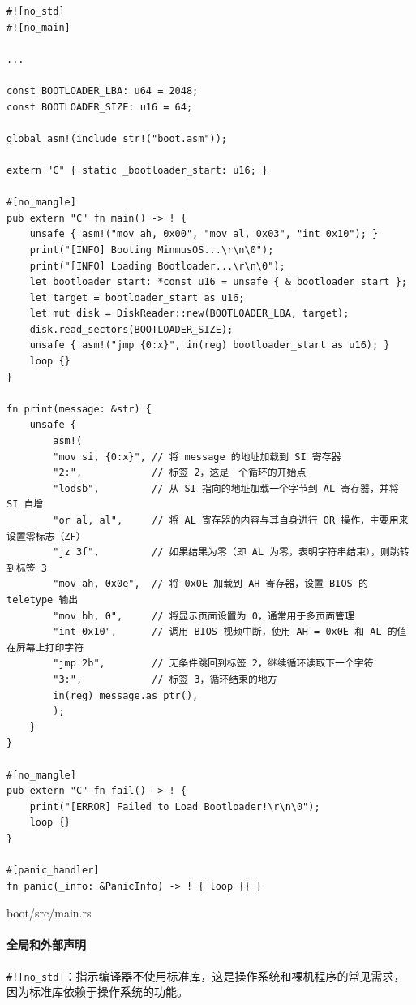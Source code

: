 \begin{listing}[htbp]
    \begin{verbatim}
#![no_std]
#![no_main]

...

const BOOTLOADER_LBA: u64 = 2048;
const BOOTLOADER_SIZE: u16 = 64;

global_asm!(include_str!("boot.asm"));

extern "C" { static _bootloader_start: u16; }

#[no_mangle]
pub extern "C" fn main() -> ! {
    unsafe { asm!("mov ah, 0x00", "mov al, 0x03", "int 0x10"); }
    print("[INFO] Booting MinmusOS...\r\n\0");
    print("[INFO] Loading Bootloader...\r\n\0");
    let bootloader_start: *const u16 = unsafe { &_bootloader_start };
    let target = bootloader_start as u16;
    let mut disk = DiskReader::new(BOOTLOADER_LBA, target);
    disk.read_sectors(BOOTLOADER_SIZE);
    unsafe { asm!("jmp {0:x}", in(reg) bootloader_start as u16); }
    loop {}
}

fn print(message: &str) {
    unsafe {
        asm!(
        "mov si, {0:x}", // 将 message 的地址加载到 SI 寄存器
        "2:",            // 标签 2，这是一个循环的开始点
        "lodsb",         // 从 SI 指向的地址加载一个字节到 AL 寄存器，并将 SI 自增
        "or al, al",     // 将 AL 寄存器的内容与其自身进行 OR 操作，主要用来设置零标志（ZF）
        "jz 3f",         // 如果结果为零（即 AL 为零，表明字符串结束），则跳转到标签 3
        "mov ah, 0x0e",  // 将 0x0E 加载到 AH 寄存器，设置 BIOS 的 teletype 输出
        "mov bh, 0",     // 将显示页面设置为 0，通常用于多页面管理
        "int 0x10",      // 调用 BIOS 视频中断，使用 AH = 0x0E 和 AL 的值在屏幕上打印字符
        "jmp 2b",        // 无条件跳回到标签 2，继续循环读取下一个字符
        "3:",            // 标签 3，循环结束的地方
        in(reg) message.as_ptr(),
        );
    }
}

#[no_mangle]
pub extern "C" fn fail() -> ! {
    print("[ERROR] Failed to Load Bootloader!\r\n\0");
    loop {}
}

#[panic_handler]
fn panic(_info: &PanicInfo) -> ! { loop {} }
    \end{verbatim}
    \caption{boot/src/main.rs}\label{lst:BootSrcMain}
\end{listing}

\paragraph{全局和外部声明}

\texttt{\#![no\_std]}：指示编译器不使用标准库，这是操作系统和裸机程序的常见需求，因为标准库依赖于操作系统的功能。

